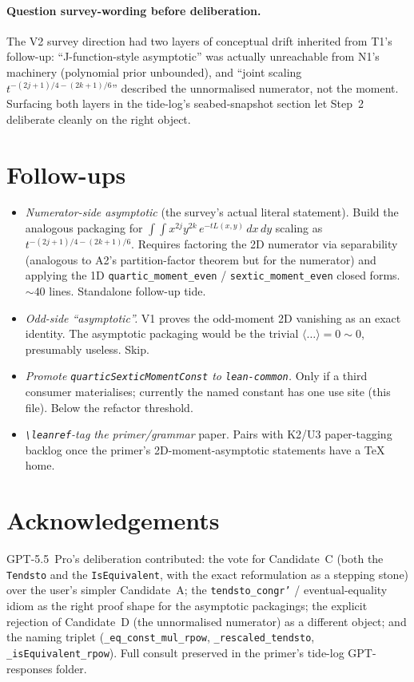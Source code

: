 \documentclass[11pt]{article}
\begin{document}
\paragraph{Question survey-wording before deliberation.} The V2
survey direction had two layers of conceptual drift inherited from
T1's follow-up: ``J-function-style asymptotic'' was actually
unreachable from N1's machinery (polynomial prior unbounded), and
``joint scaling $t^{-(2j+1)/4 - (2k+1)/6}$'' described the
unnormalised numerator, not the moment. Surfacing both layers in the
tide-log's seabed-snapshot section let Step~2 deliberate cleanly on
the right object.

\section{Follow-ups}

\begin{itemize}[leftmargin=1.5em]
\item \emph{Numerator-side asymptotic} (the survey's actual literal
  statement). Build the analogous packaging for
  $\int\!\int x^{2j} y^{2k}\,e^{-tL(x, y)}\,dx\,dy$ scaling as
  $t^{-(2j+1)/4 - (2k+1)/6}$. Requires factoring the 2D numerator
  via separability (analogous to A2's partition-factor theorem but
  for the numerator) and applying the 1D
  \texttt{quartic\_moment\_even} / \texttt{sextic\_moment\_even}
  closed forms. ${\sim}40$ lines. Standalone follow-up tide.
\item \emph{Odd-side ``asymptotic''.} V1 proves the odd-moment 2D
  vanishing as an exact identity. The asymptotic packaging would be
  the trivial $\langle\dots\rangle = 0 \sim 0$, presumably useless.
  Skip.
\item \emph{Promote \texttt{quarticSexticMomentConst} to
  \texttt{lean-common}.} Only if a third consumer materialises;
  currently the named constant has one use site (this file). Below
  the refactor threshold.
\item \emph{\texttt{\textbackslash leanref}-tag the primer/grammar}
  paper. Pairs with K2/U3 paper-tagging backlog once the primer's
  2D-moment-asymptotic statements have a TeX home.
\end{itemize}

\section*{Acknowledgements}

GPT-5.5~Pro's deliberation contributed: the vote for Candidate~C
(both the \texttt{Tendsto} and the \texttt{IsEquivalent}, with the
exact reformulation as a stepping stone) over the user's simpler
Candidate~A; the \texttt{tendsto\_congr'} / eventual-equality idiom
as the right proof shape for the asymptotic packagings; the explicit
rejection of Candidate~D (the unnormalised numerator) as a different
object; and the naming triplet
(\texttt{\_eq\_const\_mul\_rpow}, \texttt{\_rescaled\_tendsto},
\texttt{\_isEquivalent\_rpow}). Full consult preserved in the
primer's tide-log GPT-responses folder.
\end{document}
